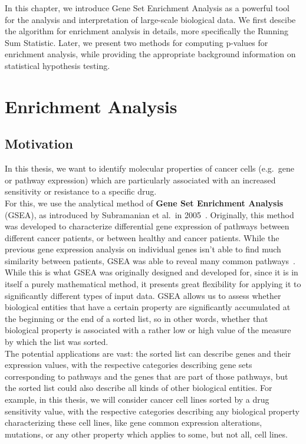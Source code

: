 
In this chapter, we introduce Gene Set Enrichment Analysis as a powerful tool for the analysis and interpretation of large-scale biological data. We first descibe the algorithm for enrichment analysis in details, more specifically the Running Sum Statistic. Later, we present two methods for computing p-values for enrichment analysis, while providing the appropriate background information on statistical hypothesis testing.

\section{Enrichment Analysis}\label{sec:enrichment}

\subsection{Motivation}\label{subsec:ea_motivation}
In this thesis, we want to identify molecular properties of cancer cells (e.g.\ gene or pathway expression) which are particularly associated with an increased sensitivity or resistance to a specific drug.\\
For this, we use the analytical method of \textbf{Gene Set Enrichment Analysis} (GSEA), as introduced by Subramanian et al.\ in 2005~\cite{gsea_original}. Originally, this method was developed to characterize differential gene expression of pathways between different cancer patients, or between healthy and cancer patients. While the previous gene expression analysis on individual genes isn't able to find much similarity between patients, GSEA was able to reveal many common pathways~\cite{gsea_original}.\\
While this is what GSEA was originally designed and developed for, since it is in itself a purely mathematical method, it presents great flexibility for applying it to significantly different types of input data. GSEA allows us to assess whether biological entities that have a certain property are significantly accumulated at the beginning or the end of a sorted list, so in other words, whether that biological property is associated with a rather low or high value of the measure by which the list was sorted.\\
The potential applications are vast: the sorted list can describe genes and their expression values, with the respective categories describing gene sets corresponding to pathways and the genes that are part of those pathways, but the sorted list could also describe all kinds of other biological entities. For example, in this thesis, we will consider cancer cell lines sorted by a drug sensitivity value, with the respective categories describing any biological property characterizing these cell lines, like gene common expression alterations, mutations, or any other property which applies to some, but not all, cell lines.\\
